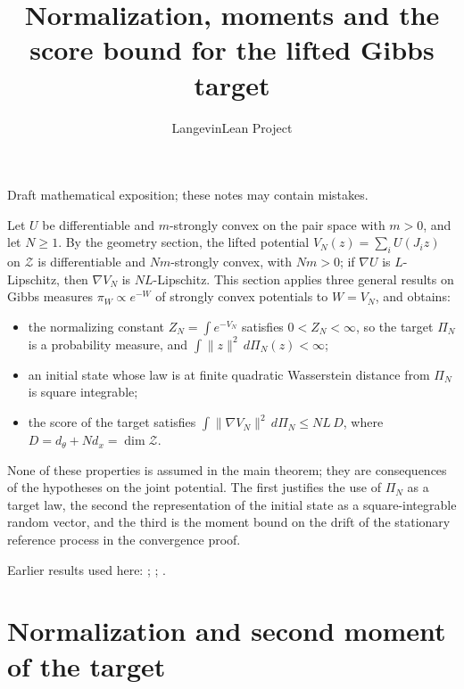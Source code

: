 \documentclass[11pt,a4paper]{article}
\title{\texorpdfstring{Normalization, moments and the score bound for the lifted Gibbs target}{Normalization, moments and the score bound for the lifted Gibbs target}}
\author{LangevinLean Project}
\date{}
\begin{document}
\maketitle
Draft mathematical exposition; these notes may contain mistakes.


Let \(U\) be differentiable and \(m\)-strongly convex on the pair space with \(m>0\), and let \(N\ge1\). By the geometry section, the lifted potential \(V_N(z)=\sum_iU(J_iz)\) on \(\mathcal Z\) is differentiable and \(Nm\)-strongly convex, with \(Nm>0\); if \(\nabla U\) is \(L\)-Lipschitz, then \(\nabla V_N\) is \(NL\)-Lipschitz. This section applies three general results on Gibbs measures \(\pi_W\propto e^{-W}\) of strongly convex potentials to \(W=V_N\), and obtains:



\begin{itemize}


\item the normalizing constant \(Z_N=\int e^{-V_N}\) satisfies \(0<Z_N<\infty\), so the target \(\Pi_N\) is a probability measure, and \(\int\|z\|^2\,d\Pi_N(z)<\infty\);

\item an initial state whose law is at finite quadratic Wasserstein distance from \(\Pi_N\) is square integrable;

\item the score of the target satisfies \(\int\|\nabla V_N\|^2\,d\Pi_N\le NL\,D\), where \(D=d_\theta+Nd_x=\dim\mathcal Z\).

\end{itemize}



None of these properties is assumed in the main theorem; they are consequences of the hypotheses on the joint potential. The first justifies the use of \(\Pi_N\) as a target law, the second the representation of the initial state as a square-integrable random vector, and the third is the moment bound on the drift of the stationary reference process in the convergence proof.



Earlier results used here: \cite[Section~3.26]{LangevinLean2026ULASC}; \cite[Section~3.27]{LangevinLean2026ULASC}; \cite[Section~3.21]{LangevinLean2026ULASC}.

\section{\texorpdfstring{Normalization and second moment of the target}{Normalization and second moment of the target}}
\end{document}
